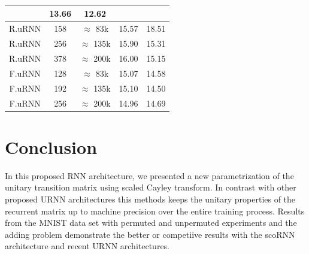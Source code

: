 \documentclass[letterpaper]{article} %
\begin{document}
\begin{table}[h]
\begin{center}
\begin{tabular}{ | c | c | c | c |c |}
& \multicolumn{1}{|c|}{13.66} 
& \multicolumn{1}{|c|}{12.62}
\\\hline
R.uRNN  
& \multicolumn{1}{|c|}{158} 
& \multicolumn{1}{|c|}{$\approx$ 83k}
& \multicolumn{1}{|c|}{15.57} 
& \multicolumn{1}{|c|}{18.51}
\\\hline
R.uRNN  
& \multicolumn{1}{|c|}{256} 
& \multicolumn{1}{|c|}{$\approx$ 135k}
& \multicolumn{1}{|c|}{15.90} 
& \multicolumn{1}{|c|}{15.31}
\\\hline
R.uRNN  
& \multicolumn{1}{|c|}{378} 
& \multicolumn{1}{|c|}{$\approx$ 200k}
& \multicolumn{1}{|c|}{16.00} 
& \multicolumn{1}{|c|}{15.15}
\\\hline
F.uRNN  
& \multicolumn{1}{|c|}{128} 
& \multicolumn{1}{|c|}{$\approx$ 83k}
& \multicolumn{1}{|c|}{15.07}
& \multicolumn{1}{|c|}{14.58}
\\\hline
F.uRNN  
& \multicolumn{1}{|c|}{192} 
& \multicolumn{1}{|c|}{$\approx$ 135k}
& \multicolumn{1}{|c|}{15.10} 
& \multicolumn{1}{|c|}{14.50}
\\\hline
F.uRNN  
& \multicolumn{1}{|c|}{256} 
& \multicolumn{1}{|c|}{$\approx$ 200k}
& \multicolumn{1}{|c|}{14.96} 
& \multicolumn{1}{|c|}{14.69}
\\\hline
\end{tabular}
\end{center}
\end{table}


\section{Conclusion}
\noindent In this proposed RNN architecture, we presented a new parametrization of the  unitary transition matrix using scaled Cayley transform. In contrast with other proposed URNN architectures this methods keeps the unitary properties of the recurrent matrix up to machine precision over the entire training process. Results from the MNIST data set with permuted and unpermuted experiments and the adding problem demonstrate the better or competiive results with the scoRNN architecture and recent URNN architectures.\\
\end{document}
